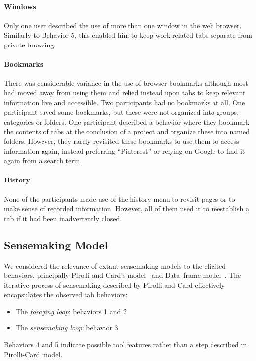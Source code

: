 \paragraph{Windows}
Only one user described the use of more than one window in the web browser. Similarly to Behavior 5, this enabled him to keep work-related tabs separate from private browsing.

\paragraph{Bookmarks}
There was considerable variance in the use of browser bookmarks although most had moved away from using them and relied instead upon tabs to keep relevant information live and accessible. Two participants had no bookmarks at all.  One participant saved some bookmarks, but these were not organized into groups, categories or folders. One participant described a behavior where they bookmark the contents of tabs at the conclusion of a project and organize these into named folders. However, they rarely revisited these bookmarks to use them to access information again, instead preferring ``Pinterest'' or relying on Google to find it again from a search term.

\paragraph{History}
None of the participants made use of the history menu to revisit pages or to make sense of recorded information. However, all of them used it to reestablish a tab if it had been inadvertently closed.

\subsection{Sensemaking Model}
We considered the relevance of extant sensemaking models to the elicited behaviors, principally Pirolli and Card's model~\cite{Pirolli2005} and Data--frame model~\cite{Klein2003}. The iterative process of sensemaking described by Pirolli and Card effectively encapsulates the observed tab behaviors:

\begin{itemize}
	\item The \emph{foraging loop}: behaviors 1 and 2
	\item The \emph{sensemaking loop}: behavior 3
\end{itemize}

Behaviors 4 and 5 indicate possible tool features rather than a step described in Pirolli-Card model.


